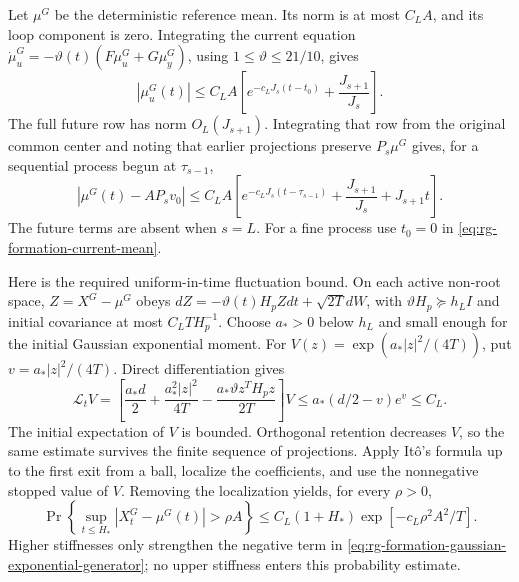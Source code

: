 Let $\mu^G$ be the deterministic reference mean. Its norm is at
most $C_LA$, and its loop component is zero. Integrating the current
equation
$\dot\mu_u^G=-\vartheta(t)(F\mu_u^G+G\mu_y^G)$, using
$1\le\vartheta\le21/10$, gives
\begin{equation}
 |\mu_u^G(t)|
 \le C_LA\left[e^{-c_LJ_s(t-t_0)}+\frac{J_{s+1}}{J_s}\right].
 \label{eq:rg-formation-current-mean}
\end{equation}
The full future row has norm $O_L(J_{s+1})$. Integrating that row
from the original common center and noting that earlier projections
preserve $P_s\mu^G$ gives, for a sequential process begun at
$\tau_{s-1}$,
\begin{equation}
 |\mu^G(t)-AP_sv_0|
 \le C_LA\left[
 e^{-c_LJ_s(t-\tau_{s-1})}
 +\frac{J_{s+1}}{J_s}+J_{s+1}t\right].
 \label{eq:rg-formation-window-mean}
\end{equation}
The future terms are absent when $s=L$. For a fine process use
$t_0=0$ in \cref{eq:rg-formation-current-mean}.

Here is the required uniform-in-time fluctuation bound. On each
active non-root space, $Z=X^G-\mu^G$ obeys
$dZ=-\vartheta(t)H_pZdt+\sqrt{2T}dW$, with
$\vartheta H_p\succeq h_LI$ and initial covariance at most
$C_LT H_p^{-1}$. Choose $a_*>0$ below $h_L$ and small enough for
the initial Gaussian exponential moment. For
$V(z)=\exp(a_*|z|^2/(4T))$, put $v=a_*|z|^2/(4T)$. Direct
differentiation gives
\begin{equation}
 \mathcal L_tV
 =\left[\frac{a_*d}{2}
 +\frac{a_*^2|z|^2}{4T}
 -\frac{a_*\vartheta z^TH_pz}{2T}\right]V
 \le a_*(d/2-v)e^v\le C_L.
 \label{eq:rg-formation-gaussian-exponential-generator}
\end{equation}
The initial expectation of $V$ is bounded. Orthogonal retention
decreases $V$, so the same estimate survives the finite sequence
of projections. Apply It\^o's formula up to the first exit from a
ball, localize the coefficients, and use the nonnegative stopped
value of $V$. Removing the localization yields, for every $\rho>0$,
\begin{equation}
 \Pr\left\{\sup_{t\le H_*}|X^G_t-\mu^G(t)|>\rho A\right\}
 \le C_L(1+H_*)
       \exp\left[-c_L\rho^2A^2/T\right].
 \label{eq:rg-formation-gaussian-maximum}
\end{equation}
Higher stiffnesses only strengthen the negative term in
\cref{eq:rg-formation-gaussian-exponential-generator}; no upper
stiffness enters this probability estimate.

